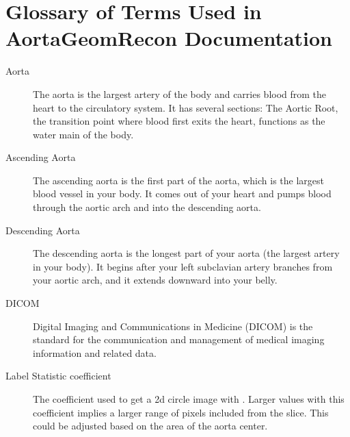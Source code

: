 \documentclass[letterpaper,10pt,english]{sphinxmanual}
\begin{document}
\section{Glossary of Terms Used in AortaGeomRecon Documentation}
\label{\detokenize{glossary:glossary-of-terms-used-in-aortageomrecon-documentation}}\label{\detokenize{glossary::doc}}\begin{description}
\item[{Aorta\label{\detokenize{glossary:term-Aorta}}}] \leavevmode
\sphinxAtStartPar
The aorta is the largest artery of the body and carries blood from the heart to the circulatory system. It has several sections: The Aortic Root, the transition point where blood first exits the heart, functions as the water main of the body.

\item[{Ascending Aorta\label{\detokenize{glossary:term-Ascending-Aorta}}}] \leavevmode
\sphinxAtStartPar
The ascending aorta is the first part of the aorta, which is the largest blood vessel in your body. It comes out of your heart and pumps blood through the aortic arch and into the descending aorta.

\item[{Descending Aorta\label{\detokenize{glossary:term-Descending-Aorta}}}] \leavevmode
\sphinxAtStartPar
The descending aorta is the longest part of your aorta (the largest artery in your body). It begins after your left subclavian artery branches from your aortic arch, and it extends downward into your belly.

\item[{DICOM\label{\detokenize{glossary:term-DICOM}}}] \leavevmode
\sphinxAtStartPar
Digital Imaging and Communications in Medicine (DICOM) is the standard for the communication and management of medical imaging information and related data.

\item[{Label Statistic coefficient\label{\detokenize{glossary:term-Label-Statistic-coefficient}}}] \leavevmode
\sphinxAtStartPar
The coefficient used to get a 2d circle image with . Larger values with this coefficient implies a larger range of pixels included from the slice. This could be adjusted based on the area of the aorta center.


\end{description}
\end{document}
